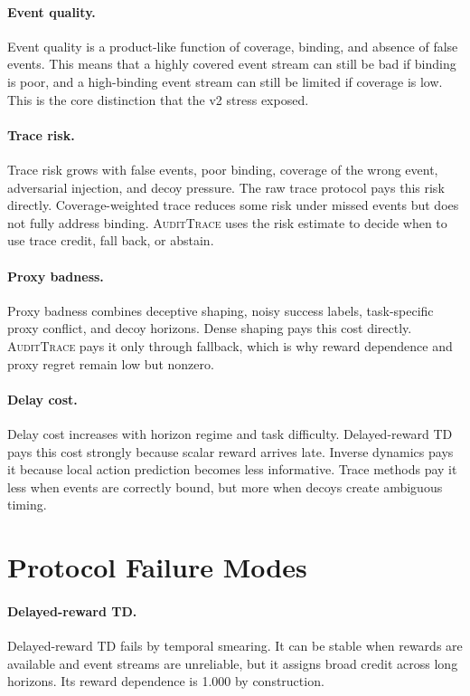 \documentclass{article}
\newcommand{\method}{\textsc{AuditTrace}\xspace}
\begin{document}
\paragraph{Event quality.}
Event quality is a product-like function of coverage, binding, and absence of false events. This means that a highly covered event stream can still be bad if binding is poor, and a high-binding event stream can still be limited if coverage is low. This is the core distinction that the v2 stress exposed.

\paragraph{Trace risk.}
Trace risk grows with false events, poor binding, coverage of the wrong event, adversarial injection, and decoy pressure. The raw trace protocol pays this risk directly. Coverage-weighted trace reduces some risk under missed events but does not fully address binding. \method uses the risk estimate to decide when to use trace credit, fall back, or abstain.

\paragraph{Proxy badness.}
Proxy badness combines deceptive shaping, noisy success labels, task-specific proxy conflict, and decoy horizons. Dense shaping pays this cost directly. \method pays it only through fallback, which is why reward dependence and proxy regret remain low but nonzero.

\paragraph{Delay cost.}
Delay cost increases with horizon regime and task difficulty. Delayed-reward TD pays this cost strongly because scalar reward arrives late. Inverse dynamics pays it because local action prediction becomes less informative. Trace methods pay it less when events are correctly bound, but more when decoys create ambiguous timing.

\section{Protocol Failure Modes}

\paragraph{Delayed-reward TD.}
Delayed-reward TD fails by temporal smearing. It can be stable when rewards are available and event streams are unreliable, but it assigns broad credit across long horizons. Its reward dependence is 1.000 by construction.
\end{document}
